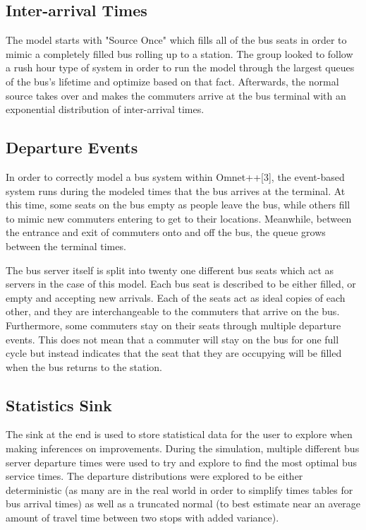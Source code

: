 \documentclass{article}
\begin{document}
\subsection{Inter-arrival Times}
   The model starts with "Source Once" which fills all of the bus seats in order to mimic a completely filled bus rolling up to a station. The group looked to follow a rush hour type of system in order to run the model through the largest queues of the bus's lifetime and optimize based on that fact. Afterwards, the normal source takes over and makes the commuters arrive at the bus terminal with an exponential distribution of inter-arrival times. 
 
\subsection{Departure Events}
   In order to correctly model a bus system within Omnet++[3], the event-based system runs during the modeled times that the bus arrives at the terminal. At this time, some seats on the bus empty as people leave the bus, while others fill to mimic new commuters entering to get to their locations. Meanwhile, between the entrance and exit of commuters onto and off the bus, the queue grows between the terminal times.
   
   The bus server itself is split into twenty one different bus seats which act as servers in the case of this model. Each bus seat is described to be either filled, or empty and accepting new arrivals. Each of the seats act as ideal copies of each other, and they are interchangeable to the commuters that arrive on the bus. Furthermore, some commuters stay on their seats through multiple departure events. This does not mean that a commuter will stay on the bus for one full cycle but instead indicates that the seat that they are occupying will be filled when the bus returns to the station. 

\subsection{Statistics Sink}
	The sink at the end is used to store statistical data for the user to explore when making inferences on improvements. During the simulation, multiple different bus server departure times were used to try and explore to find the most optimal bus service times. The departure distributions were explored to be either deterministic (as many are in the real world in order to simplify times tables for bus arrival times) as well as a truncated normal (to best estimate near an average amount of travel time between two stops with added variance). 
    
\end{document}
